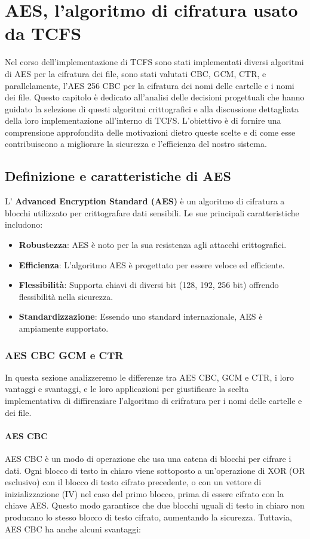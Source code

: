 \chapter{AES, l’algoritmo di cifratura usato da TCFS}
Nel corso dell'implementazione di TCFS sono stati implementati diversi algoritmi di AES per la cifratura dei file, sono stati valutati CBC, GCM, CTR, e parallelamente, l’AES 256 CBC per la cifratura dei nomi delle cartelle e i nomi dei file. Questo capitolo è dedicato all’analisi delle decisioni progettuali che hanno guidato la selezione di questi algoritmi crittografici e alla discussione dettagliata della loro implementazione all’interno di TCFS. L’obiettivo è di fornire una comprensione approfondita delle motivazioni dietro queste scelte e di come esse contribuiscono a migliorare la sicurezza e l’efficienza del nostro sistema.

\section{Definizione e caratteristiche di AES}
L' \textbf{Advanced Encryption Standard (AES)} è un algoritmo di cifratura a blocchi utilizzato per crittografare dati sensibili. Le sue principali caratteristiche includono:
\begin{itemize}
    \item \textbf{Robustezza}: AES è noto per la sua resistenza agli attacchi crittografici.
    \item \textbf{Efficienza}: L'algoritmo AES è progettato per essere veloce ed efficiente.
    \item \textbf{Flessibilità}: Supporta chiavi di diversi bit (128, 192, 256 bit) offrendo flessibilità nella sicurezza.
    \item \textbf{Standardizzazione}: Essendo uno standard internazionale, AES è ampiamente supportato.
\end{itemize}

\subsection{AES CBC GCM e CTR}
In questa sezione analizzeremo le differenze tra AES CBC, GCM e CTR, i loro vantaggi e svantaggi, e le loro applicazioni per giustificare la scelta implementativa di diffirenziare l'algoritmo di crifratura per i nomi delle cartelle e dei file.

\subsubsection{AES CBC}
AES CBC è un modo di operazione che usa una catena di blocchi per cifrare i dati. Ogni blocco di testo in chiaro viene sottoposto a un’operazione di XOR (OR esclusivo) con il blocco di testo cifrato precedente, o con un vettore di inizializzazione (IV) nel caso del primo blocco, prima di essere cifrato con la chiave AES. Questo modo garantisce che due blocchi uguali di testo in chiaro non producano lo stesso blocco di testo cifrato, aumentando la sicurezza. Tuttavia, AES CBC ha anche alcuni svantaggi:

